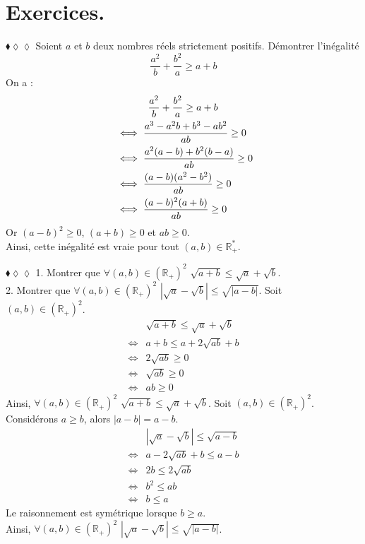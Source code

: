 \documentclass[11pt]{article}
\begin{document}
\section{Exercices.}

\begin{exercice}{$\blacklozenge\lozenge\lozenge$}{}
    Soient $a$ et $b$ deux nombres réels strictement positifs. Démontrer l'inégalité
    \begin{equation*}
        \frac{a^2}{b}+\frac{b^2}{a} \geq a + b
    \end{equation*}
    \tcblower
    On a :
    \begin{align*}
        &\hspace{1.2cm}\frac{a^2}{b}+\frac{b^2}{a} \geq a+b\\
        &\iff\frac{a^3-a^2b+b^3-ab^2}{ab}\geq0\\
        &\iff\frac{a^2(a-b)+b^2(b-a)}{ab}\geq0\\
        &\iff\frac{(a-b)(a^2-b^2)}{ab}\geq0\\
        &\iff\frac{(a-b)^2(a+b)}{ab}\geq0
    \end{align*}
    Or $(a-b)^2\geq0$, $(a+b)\geq0$ et $ab\geq0$.\\
    Ainsi, cette inégalité est vraie pour tout $(a,b)\in\mathbb{R}^*_+$.
\end{exercice}

\begin{exercice}{$\blacklozenge\lozenge\lozenge$}{}
    1. Montrer que $\forall(a,b)\in(\mathbb{R}_+)^2$ $\sqrt{a+b}\leq\sqrt{a}+\sqrt{b}$.\\
    2. Montrer que $\forall(a,b)\in(\mathbb{R}_+)^2$ $|\sqrt{a}-\sqrt{b}|\leq\sqrt{|a-b|}$.
    \tcblower
     Soit $(a,b)\in(\mathbb{R}_+)^2$.
    \begin{align*}
        &\sqrt{a+b}\leq\sqrt{a}+\sqrt{b}\\
        \iff&a+b\leq a + 2\sqrt{ab} + b\\
        \iff&2\sqrt{ab} \geq 0\\
        \iff&\sqrt{ab} \geq 0\\
        \iff&ab \geq 0
    \end{align*}
    Ainsi, $\forall(a,b)\in(\mathbb{R}_+)^2$ $\sqrt{a+b}\leq\sqrt{a}+\sqrt{b}$.\n
     Soit $(a,b)\in(\mathbb{R}_+)^2$.\\
    Considérons $a\geq b$, alors $|a-b| = a-b$.
    \begin{align*}
        &|\sqrt{a}-\sqrt{b}|\leq\sqrt{a-b}\\
        \iff& a - 2\sqrt{ab} + b \leq a-b\\
        \iff& 2b \leq 2\sqrt{ab}\\
        \iff& b^2 \leq ab\\
        \iff&b \leq a
    \end{align*}
    Le raisonnement est symétrique lorsque $b\geq a$.\\
    Ainsi, $\forall(a,b)\in(\mathbb{R}_+)^2$ $|\sqrt{a}-\sqrt{b}|\leq\sqrt{|a-b|}$.
\end{exercice}
\end{document}

